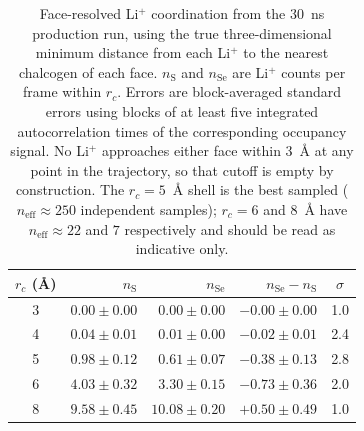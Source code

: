 \begin{table}[htbp]
\caption{Face-resolved Li$^+$ coordination from the 30~ns production run,
using the true three-dimensional minimum distance from each Li$^+$ to the
nearest chalcogen of each face. $n_{\mathrm{S}}$ and $n_{\mathrm{Se}}$ are
Li$^+$ counts per frame within $r_c$. Errors are block-averaged standard
errors using blocks of at least five integrated autocorrelation times of
the corresponding occupancy signal. No Li$^+$ approaches either face
within 3~\AA{} at any point in the trajectory, so that cutoff is empty by
construction. The $r_c = 5$~\AA{} shell is the best sampled
($n_{\mathrm{eff}} \approx 250$ independent samples); $r_c = 6$ and
8~\AA{} have $n_{\mathrm{eff}} \approx 22$ and $7$ respectively and
should be read as indicative only.}
\label{tab:contacts}
\centering
\begin{tabular}{crrrc}
\hline
$r_c$ (\AA) & $n_{\mathrm{S}}$ & $n_{\mathrm{Se}}$ & $n_{\mathrm{Se}}-n_{\mathrm{S}}$ & $\sigma$ \\
\hline
3 & $0.00 \pm 0.00$ & $0.00 \pm 0.00$ & $-0.00 \pm 0.00$ & 1.0 \\
4 & $0.04 \pm 0.01$ & $0.01 \pm 0.00$ & $-0.02 \pm 0.01$ & 2.4 \\
5 & $0.98 \pm 0.12$ & $0.61 \pm 0.07$ & $-0.38 \pm 0.13$ & 2.8 \\
6 & $4.03 \pm 0.32$ & $3.30 \pm 0.15$ & $-0.73 \pm 0.36$ & 2.0 \\
8 & $9.58 \pm 0.45$ & $10.08 \pm 0.20$ & $+0.50 \pm 0.49$ & 1.0 \\
\hline
\end{tabular}
\end{table}

